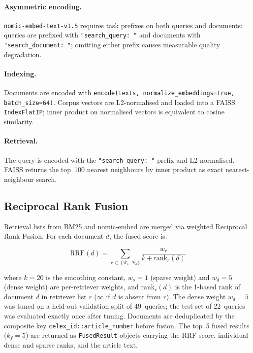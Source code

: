 \documentclass[sigconf,screen]{acmart}
\newcommand{\nomic}{\texttt{nomic-embed-text-v1.5}\xspace}
\newcommand{\nomicshort}{nomic-embed\xspace}
\begin{document}
\paragraph{Asymmetric encoding.}
\nomic requires task prefixes on both queries and documents:
queries are prefixed with \texttt{"search\_query: "} and documents
with \texttt{"search\_document: "}; omitting either prefix causes
measurable quality degradation.

\paragraph{Indexing.}
Documents are encoded with
\texttt{encode(texts, normalize\_embeddings=True, batch\_size=64)}.
Corpus vectors are L2-normalised and loaded into a FAISS
\texttt{IndexFlatIP}; inner product on normalised vectors is
equivalent to cosine similarity.

\paragraph{Retrieval.}
The query is encoded with the \texttt{"search\_query: "} prefix and
L2-normalised.  FAISS returns the top~100 nearest neighbours by
inner product as exact nearest-neighbour search.

\subsection{Reciprocal Rank Fusion}
\label{sec:rrf}

Retrieval lists from BM25 and \nomicshort are merged via weighted
Reciprocal Rank Fusion.  For each document $d$, the fused score is:

\begin{equation}
  \label{eq:rrf}
  \mathrm{RRF}(d) = \sum_{r \,\in\, \{\mathcal{R}_s,\, \mathcal{R}_d\}}
    \frac{w_r}{k + \mathrm{rank}_r(d)}
\end{equation}

\noindent where $k{=}20$ is the smoothing constant,
$w_s{=}1$ (sparse weight) and $w_d{=}5$ (dense weight) are
per-retriever weights, and $\mathrm{rank}_r(d)$ is the 1-based rank
of document $d$ in retriever list $r$ ($\infty$ if $d$ is absent
from $r$).  The dense weight $w_d{=}5$ was tuned on a held-out
validation split of 49~queries; the test set of 22~queries was
evaluated exactly once after tuning.  Documents are deduplicated by
the composite key \texttt{celex\_id::article\_number} before fusion.
The top~5 fused results ($k_f{=}5$) are returned as
\texttt{FusedResult} objects carrying the RRF score, individual
dense and sparse ranks, and the article text.
\end{document}
